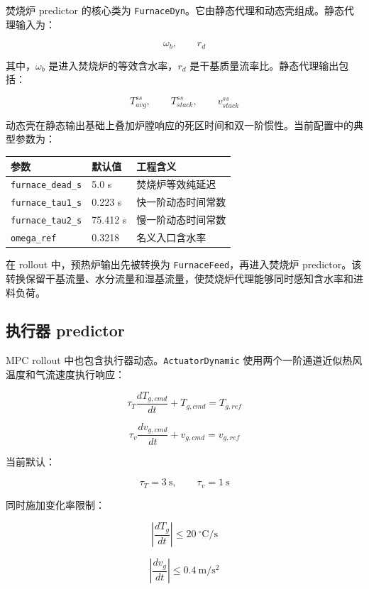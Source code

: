 \documentclass[UTF8,openany,zihao=-4,oneside]{ctexbook}
\providecommand{\passthrough}[1]{#1}
\begin{document}
焚烧炉 predictor 的核心类为 \passthrough{\lstinline!FurnaceDyn!}。它由静态代理和动态壳组成。静态代理输入为：

\[
\omega_b,\qquad r_d
\]

其中，\(\omega_b\) 是进入焚烧炉的等效含水率，\(r_d\) 是干基质量流率比。静态代理输出包括：

\[
T_{avg}^{ss},\qquad T_{stack}^{ss},\qquad v_{stack}^{ss}
\]

动态壳在静态输出基础上叠加炉膛响应的死区时间和双一阶惯性。当前配置中的典型参数为：

\begin{longtable}[c]{@{}p{}p{}p{}@{}}
\toprule\noalign{}
参数 & 默认值 & 工程含义 \\
\midrule\noalign{}
\endhead
\bottomrule\noalign{}
\endlastfoot
\passthrough{\lstinline!furnace_dead_s!} & 5.0 s & 焚烧炉等效纯延迟 \\
\passthrough{\lstinline!furnace_tau1_s!} & 0.223 s & 快一阶动态时间常数 \\
\passthrough{\lstinline!furnace_tau2_s!} & 75.412 s & 慢一阶动态时间常数 \\
\passthrough{\lstinline!omega_ref!} & 0.3218 & 名义入口含水率 \\
\end{longtable}

在 rollout 中，预热炉输出先被转换为 \passthrough{\lstinline!FurnaceFeed!}，再进入焚烧炉 predictor。该转换保留干基流量、水分流量和湿基流量，使焚烧炉代理能够同时感知含水率和进料负荷。

\subsection{执行器 predictor}\label{subsec:actuator-predictor-impl}

MPC rollout 中也包含执行器动态。\passthrough{\lstinline!ActuatorDynamic!} 使用两个一阶通道近似热风温度和气流速度执行响应：

\[
\tau_T \frac{dT_{g,cmd}}{dt}+T_{g,cmd}=T_{g,ref}
\]

\[
\tau_v \frac{dv_{g,cmd}}{dt}+v_{g,cmd}=v_{g,ref}
\]

当前默认：

\[
\tau_T=3\ \mathrm{s},\qquad \tau_v=1\ \mathrm{s}
\]

同时施加变化率限制：

\[
\left|\frac{dT_g}{dt}\right|\le 20\ ^\circ\mathrm{C/s}
\]

\[
\left|\frac{dv_g}{dt}\right|\le 0.4\ \mathrm{m/s^2}
\]
\end{document}
